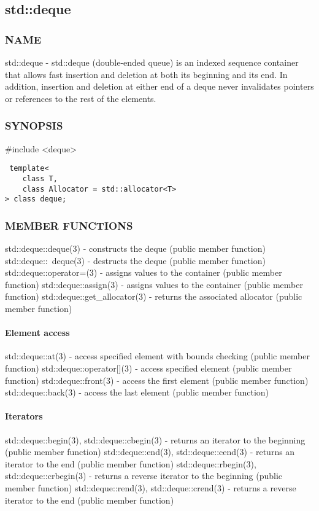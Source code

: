 \subsection{std::deque}

\subsubsection{NAME}
std::deque - std::deque (double-ended queue) is an indexed sequence container that allows fast insertion and deletion at both its beginning and its end. In addition, insertion and deletion at either end of a deque never invalidates pointers or references to the rest of the elements.

\subsubsection{SYNOPSIS}
\#include <deque>

\begin{lstlisting}
 template<
    class T,
    class Allocator = std::allocator<T>
> class deque;
\end{lstlisting}

\subsubsection{MEMBER FUNCTIONS}
std::deque::deque(3) - constructs the deque  (public member function)
std::deque::~deque(3) - destructs the deque  (public member function)
std::deque::operator=(3) - assigns values to the container   (public member function)
std::deque::assign(3) - assigns values to the container   (public member function)
std::deque::get\_allocator(3) - returns the associated allocator   (public member function)
\paragraph{Element access}
std::deque::at(3) - access specified element with bounds checking   (public member function)
std::deque::operator[](3) - access specified element   (public member function)
std::deque::front(3) - access the first element   (public member function)
std::deque::back(3) - access the last element   (public member function)
\paragraph{Iterators}
std::deque::begin(3), std::deque::cbegin(3) - returns an iterator to the beginning   (public member function)
std::deque::end(3), std::deque::cend(3) - returns an iterator to the end   (public member function)
std::deque::rbegin(3), std::deque::crbegin(3) - returns a reverse iterator to the beginning   (public member function)
std::deque::rend(3), std::deque::crend(3) - returns a reverse iterator to the end   (public member function)
